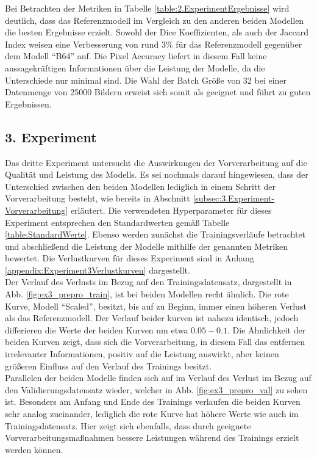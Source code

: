 Bei Betrachten der Metriken in Tabelle \ref{table:2.ExperimentErgebnisse} wird deutlich, dass das Referenzmodell im Vergleich zu den anderen beiden Modellen die besten Ergebnisse erzielt. Sowohl der Dice Koeffizienten, als auch der Jaccard Index weisen eine Verbesserung von rund $3\%$ für das Referenzmodell gegenüber dem Modell ``B64'' auf. Die Pixel Accuracy liefert in diesem Fall keine aussagekräftigen Informationen über die Leistung der Modelle, da die Unterschiede nur minimal sind. Die Wahl der Batch Größe von 32 bei einer Datenmenge von 25000 Bildern erweist sich somit als geeignet und führt zu guten Ergebnissen.


\subsection{3. Experiment}
\label{subsec:3.Experiment}
Das dritte Experiment untersucht die Auswirkungen der Vorverarbeitung auf die Qualität und Leistung des Modells. Es sei nochmals darauf hingewiesen, dass der Unterschied zwischen den beiden Modellen lediglich in einem Schritt der Vorverarbeitung besteht, wie bereits in Abschnitt \ref{subsec:3.Experiment-Vorverarbeitung} erläutert. Die verwendeten Hyperparameter für dieses Experiment entsprechen den Standardwerten gemäß Tabelle \ref{table:StandardWerte}. Ebenso werden zunächst die Trainingsverläufe betrachtet und abschließend die Leistung der Modelle mithilfe der genannten Metriken bewertet. Die Verlustkurven für dieses Experiment sind in Anhang \ref{appendix:Experiment3Verlustkurven} dargestellt.\\
Der Verlauf des Verlusts im Bezug auf den Trainingsdatensatz, dargestellt in Abb. \ref{fig:ex3_prepro_train}, ist bei beiden Modellen recht ähnlich. Die rote Kurve, Modell ``Scaled'', besitzt, bis auf zu Beginn, immer einen höheren Verlust als das Referenzmodell. Der Verlauf beider kurven ist nahezu identisch, jedoch differieren die Werte der beiden Kurven um etwa $0.05 - 0.1$. Die Ähnlichkeit der beiden Kurven zeigt, dass sich die Vorverarbeitung, in diesem Fall das entfernen irrelevanter Informationen, positiv auf die Leistung auswirkt, aber keinen größeren Einfluss auf den Verlauf des Trainings besitzt.\\
Parallelen der beiden Modelle finden sich auf im Verlauf des Verlust im Bezug auf den Validierungsdatensatz wieder, welcher in Abb. \ref{fig:ex3_prepro_val} zu sehen ist. Besonders am Anfang und Ende des Trainings verlaufen die beiden Kurven sehr analog zueinander, lediglich die rote Kurve hat höhere Werte wie auch im Trainingsdatensatz. Hier zeigt sich ebenfalls, dass durch geeignete Vorverarbeitungsmaßnahmen bessere Leistungen während des Trainings erzielt werden können.

